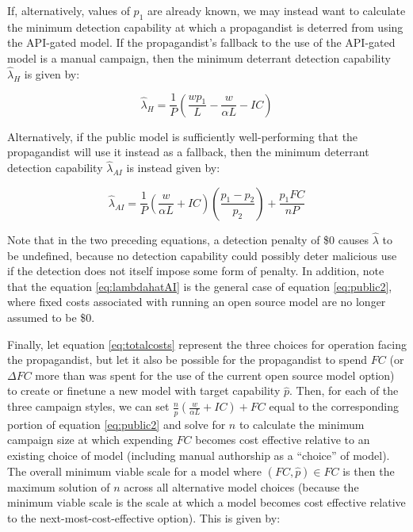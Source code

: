 \documentclass{article}
\begin{document}
If, alternatively, values of $p_1$ are already known, we may instead want to calculate the minimum detection capability at which a propagandist is deterred from using the API-gated model. If the propagandist's fallback to the use of the API-gated model is a manual campaign, then the minimum deterrant detection capability $\hat{\lambda}_H$ is given by:  

\begin{equation}
  \hat{\lambda}_{H} = \frac{1}{P} \left( \frac{w p_1}{L} - \frac{w}{\alpha L} - IC \right)
\end{equation}

Alternatively, if the public model is sufficiently well-performing that the propagandist will use it instead as a fallback, then the minimum deterrant detection capability $\hat{\lambda}_{AI}$ is instead given by:

\begin{equation}
  \label{eq:lambdahatAI}
  \hat{\lambda}_{AI} = \frac{1}{P} \left( \frac{w}{\alpha L} + IC \right) \left( \frac{p_1 - p_2}{p_2} \right) + \frac{p_1 FC}{n P}
\end{equation}

Note that in the two preceding equations, a detection penalty of \$0 causes $\hat{\lambda}$ to be undefined, because no detection capability could possibly deter malicious use if the detection does not itself impose some form of penalty. In addition, note that the equation \ref{eq:lambdahatAI} is the general case of equation \ref{eq:public2}, where fixed costs associated with running an open source model are no longer assumed to be \$0.

Finally, let equation \ref{eq:totalcosts} represent the three choices for operation facing the propagandist, but let it also be possible for the propagandist to spend $FC$ (or $\Delta FC$ more than was spent for the use of the current open source model option) to create or finetune a new model with target capability $\hat{p}$. Then, for each of the three campaign styles, we can set $\frac{n}{\hat{p}} \left( \frac{w}{\alpha L} + IC \right) + FC$ equal to the corresponding portion of equation \ref{eq:public2} and solve for $n$ to calculate the minimum campaign size at which expending $FC$ becomes cost effective relative to an existing choice of model (including manual authorship as a ``choice'' of model). The overall minimum viable scale for a model where $(FC, \hat{p}) \in FC$ is then the maximum solution of $n$ across all alternative model choices (because the minimum viable scale is the scale at which a model becomes cost effective relative to the next-most-cost-effective option). This is given by:
\end{document}
